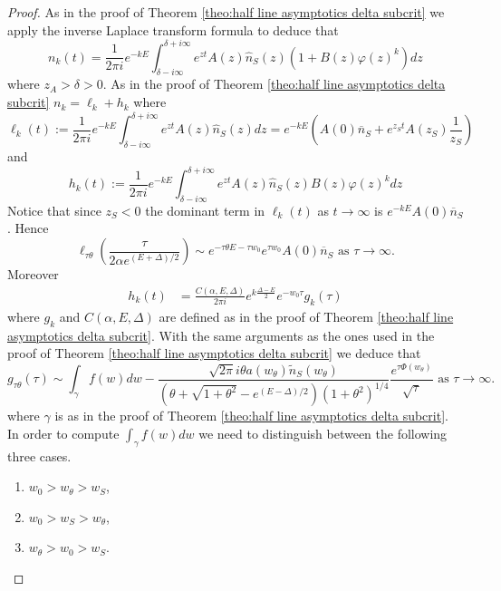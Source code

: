 \documentclass[10pt,a4paper]{amsart}
\begin{document}
\begin{proof}
As in the proof of Theorem \ref{theo:half line asymptotics delta subcrit} we apply the inverse Laplace transform formula to deduce that
\[
n_k(t)= \frac{1}{2 \pi i } e^{- k E } \int_{\delta - i \infty }^{\delta + i \infty } e^{ zt } A(z) \hat{n}_S(z) \left( 1+ B(z)  \varphi(z)^k  \right) dz   
\]
where $z_A > \delta > 0 $. 
As in the proof of Theorem \ref{theo:half line asymptotics delta subcrit} $n_k=\ell_k+ h_k$ where  
\begin{equation} \label{lk}
\ell_k (t):= \frac{1}{2 \pi i } e^{- k E } \int_{\delta - i \infty }^{\delta + i \infty } e^{ zt } A(z) \hat{n}_S(z)  dz = e^{- k E } \left( A(0) \overline {n}_S + e^{ z_S t } A(z_S ) \frac{1}{z_S} \right)
\end{equation}
and 
\begin{equation}\label{def:h_k2}
h_k (t):= \frac{1}{2 \pi i } e^{- k E } \int_{\delta - i \infty }^{\delta + i \infty } e^{ zt } A(z) \hat{n}_S(z) B(z) \varphi(z)^k   dz
\end{equation}
Notice that since $ z_S <0 $ the dominant term in $ \ell_k(t)$ as $t \rightarrow \infty $ is $ e^{- k E } A(0) \overline {n}_S $. Hence
\[
\ell_{\tau \theta } \left( \frac{\tau }{ 2 \alpha e^{(E+\Delta)/2} }\right)  \sim  e^{- \tau \theta E - \tau w_0 } e^{ \tau w_0 } A(0) \overline {n}_S  \text{ as } \tau \to \infty. 
\]
Moreover 
\begin{align*}
h_k(t)&=   \frac{C(\alpha, E, \Delta)}{2 \pi i } e^{k \frac{\Delta - E }{2}}e^{- w_0 \tau }g_k(\tau ) 
\end{align*}
where $g_k$ and $C(\alpha, E, \Delta)$  are defined as in the proof of Theorem \ref{theo:half line asymptotics delta subcrit}. 
With the same arguments as the ones used in the proof of Theorem \ref{theo:half line asymptotics delta subcrit} we deduce that 
\[
g_{\tau \theta } (\tau)  \sim  \int_{\gamma}f(w) dw -  \frac{    \sqrt{2\pi} i \theta a(w_\theta ) \tilde{n}_S(w_\theta )}{(\theta+ \sqrt{1+ \theta^2 } - e^{(E-\Delta)/2}) (1+\theta^2)^{1/4}} \frac{ e^{ \tau \Phi(w_\theta ) }}{\sqrt{\tau}} \text{ as } \tau \to \infty. 
\]
where $\gamma  $ is as in the proof of Theorem \ref{theo:half line asymptotics delta subcrit}. 
In order to compute $\int_{\gamma}f(w) dw$ we need to distinguish between the following three cases. 
\begin{enumerate} 
\item $w_0 > w_\theta > w_S  $, 
\item $ w_0 > w_S > w_\theta $, 
\item $ w_\theta > w_0> w_S $.
\end{enumerate}



\end{proof}
\end{document}
